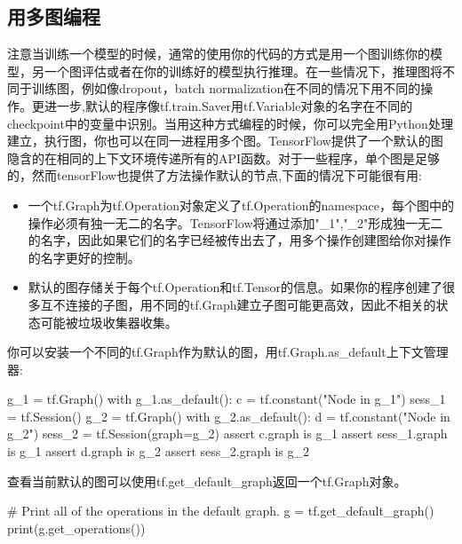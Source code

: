 \subsection{用多图编程}
注意当训练一个模型的时候，通常的使用你的代码的方式是用一个图训练你的模型，另一个图评估或者在你的训练好的模型执行推理。在一些情况下，推理图将不同于训练图，例如像dropout，batch normalization在不同的情况下用不同的操作。更进一步,默认的程序像tf.train.Saver用tf.Variable对象的名字在不同的checkpoint中的变量中识别。当用这种方式编程的时候，你可以完全用Python处理建立，执行图，你也可以在同一进程用多个图。TensorFlow提供了一个默认的图隐含的在相同的上下文环境传递所有的API函数。对于一些程序，单个图是足够的，然而tensorFlow也提供了方法操作默认的节点,下面的情况下可能很有用:
\begin{itemize}
	\item 一个tf.Graph为tf.Operation对象定义了tf.Operation的namespace，每个图中的操作必须有独一无二的名字。TensorFlow将通过添加"\_1","\_2"形成独一无二的名字，因此如果它们的名字已经被传出去了，用多个操作创建图给你对操作的名字更好的控制。
	\item 默认的图存储关于每个tf.Operation和tf.Tensor的信息。如果你的程序创建了很多互不连接的子图，用不同的tf.Graph建立子图可能更高效，因此不相关的状态可能被垃圾收集器收集。
\end{itemize}
你可以安装一个不同的tf.Graph作为默认的图，用tf.Graph.as\_default上下文管理器:
\begin{python}
g_1 = tf.Graph()
with g_1.as_default():
    c = tf.constant("Node in g_1")
    sess_1 = tf.Session()
g_2 = tf.Graph()
with g_2.as_default():
    d = tf.constant("Node in g_2")
sess_2 = tf.Session(graph=g_2)
assert c.graph is g_1
assert sess_1.graph is g_1
assert d.graph is g_2
assert sess_2.graph is g_2
\end{python}
查看当前默认的图可以使用tf.get\_default\_graph返回一个tf.Graph对象。
\begin{python}
# Print all of the operations in the default graph.
g = tf.get_default_graph()
print(g.get_operations())
\end{python}
